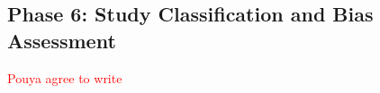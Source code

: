 \documentclass[acmsmall]{acmart}
\begin{document}


\subsection{Phase 6: Study Classification and Bias Assessment}\label{subsec:phase-6-study-classification-and-bias-assessment}
\textcolor{red}{Pouya agree to write}

\end{document}

